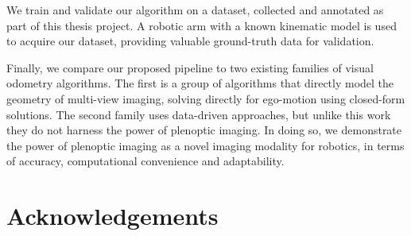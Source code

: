 \documentclass[openany]{book}
\begin{document}

We train and validate our algorithm on a dataset, collected and annotated as part of this thesis project. A robotic arm with a known kinematic model is used to acquire our dataset, providing valuable ground-truth data for validation.

Finally, we compare our proposed pipeline to two existing families of visual odometry algorithms. The first is a group of algorithms that directly model the geometry of multi-view imaging, solving directly for ego-motion using closed-form solutions. The second family uses data-driven approaches, but unlike this work they do not harness the power of plenoptic imaging. In doing so, we demonstrate the power of plenoptic imaging as a novel imaging modality for robotics, in terms of accuracy, computational convenience and adaptability.


\chapter*{Acknowledgements}





\tableofcontents
\listoffigures
\listoftables

\mainmatter








\newpage



\end{document}
